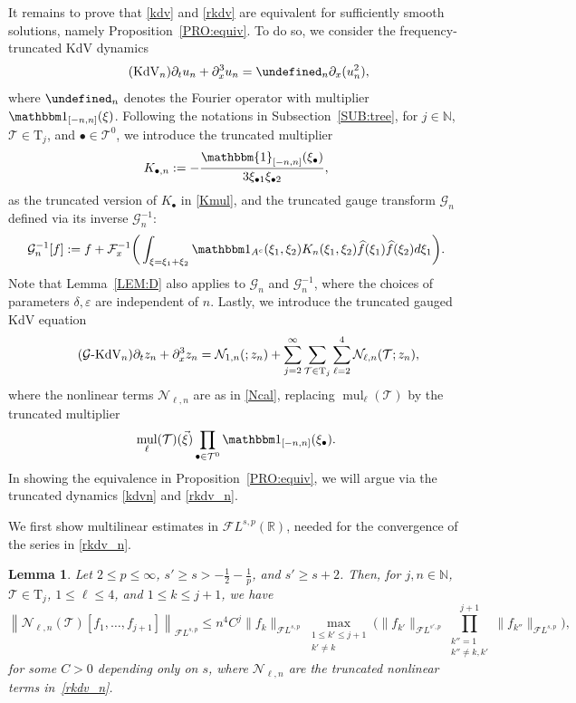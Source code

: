 \documentclass[a4paper,
11pt,  reqno]{amsart}
\makeatletter
\newcommand{\5}{\textup{V}}
\newcommand{\FL}{\mathcal{F} L}
\newcommand{\ft}{\widehat}
\newcommand{\ind}{\mathbbm 1}
\newcommand{\dl}{\delta}
\newcommand{\eps}{\varepsilon}
\newcommand{\dx}{\partial_x}
\newcommand{\dt}{\partial_t}
\newtheorem{lemma}[theorem]{Lemma}
\theoremstyle{remark}
\newcommand{\R}{\mathbb{R}}
\newcommand{\bul}{\bullet}
\let\P= \undefined
\newcommand{\P}{\mathbf{P}}
\newcommand{\TT}{\mathcal{T}}
\newcommand{\Tr}{\mathrm{T}}
\newcommand{\Ft}{{\mathcal{F}}}
\renewcommand{\l}{\ell}
\newcommand{\N}{\mathbb{N}}
\DeclareMathOperator{\mul}{mul}
\def\<#1>{\csname MH@symb@#1\endcsname}
\newcommand{\Gc}{\mathcal{G}}
\numberwithin{equation}{section}
\numberwithin{theorem}{section}
\newcommand{\Ncal}{\mathcal{N}}
\makeatother
\begin{document}
It remains to prove that \eqref{kdv} and \eqref{rkdv} are equivalent for sufficiently smooth solutions, namely Proposition~\ref{PRO:equiv}.
To do so, we consider the frequency-truncated KdV dynamics
\begin{equation}\label{kdvn}\tag{KdV$_n$}
	\partial_t u_n+\partial_x^3 u_n = \P_{n}\partial_x(u_n^2),
\end{equation}
where $\P_n$ denotes the Fourier operator with multiplier $\ind_{[-n,n]}(\xi)$. Following the notations in Subsection~\ref{SUB:tree}, for $j\in \N$, $\TT\in\Tr_j$, and $\bul\in \TT^0$, we introduce the truncated multiplier
\begin{align}\label{Kmuln}
K_{\bul, n}:=-\frac{\mathbbm{1}_{[-n,n]}(\xi_\bul)}{3\xi_{\bul 1}\xi_{\bul2}},
\end{align}
as the truncated version of $K_\bul$ in \eqref{Kmul}, and the truncated gauge transform $\Gc_n$ defined via its inverse $\Gc_n^{-1}$:
   \begin{equation}
	\label{gauge_n}
	\Gc_n^{-1}[f]
	:= f + \Ft_x^{-1}\bigg( \int_{\xi=\xi_1+\xi_2} \ind_{A^c}(\xi_1,\xi_2) K_n(\xi_1,\xi_2) \ft{f}(\xi_1) \ft{f}(\xi_2) d\xi_1 \bigg).
\end{equation}
Note that Lemma~\ref{LEM:D} also applies to $\Gc_n$ and $\Gc_n^{-1}$, where the choices of parameters $\dl, \eps$ are independent of $n$.
%
Lastly, we introduce the truncated gauged KdV equation
\begin{equation}\label{rkdv_n}\tag{$\Gc$-KdV$_n$}
	\dt z_n
	+ \dx^3 z_n
	=
	\Ncal_{1,n}(\<1>;z_n) + \sum_{j=2}^\infty \sum_{\TT \in \Tr_j} \sum_{\l=2}^4  \Ncal_{\l,n}(\TT;z_n),
\end{equation}
where the nonlinear terms $\Ncal_{\l, n}$ are as in \eqref{Ncal}, replacing $\mul_\l(\TT)$ by the truncated multiplier
\begin{align}
\mul_\l (\TT) (\vec\xi) \prod_{\bul\in \TT^0} \ind_{[-n,n]}(\xi_\bul).
\end{align}
In showing the equivalence in Proposition~\ref{PRO:equiv}, we will argue via the truncated dynamics \eqref{kdvn} and \eqref{rkdv_n}.

We first show multilinear estimates in $\FL^{s,p}(\R)$, needed for the convergence of the series in \eqref{rkdv_n}.
\begin{lemma}\label{lem:estimativas_brutas}
Let $2 \le p \le \infty$, $s'\ge s > - \frac12 - \frac1p$, and $s'\ge s +2$. Then, for $j, n\in\N$, $\TT\in\Tr_j$, $1\le \l \le 4$, and $1 \le k \le j+1$, we have
\begin{equation}\label{eq:boundNn}
		\left\|\mathcal{N}_{\ell,n}(\TT)[f_1,\dots,f_{j+1}] \right\|_{\FL^{s,p}} \le  n^4 C^j \|f_k\|_{\FL^{s,p}}
\max_{\substack{1 \le k' \le  j+1 \\ k' \ne k}}
\bigg(
\|f_{k'}\|_{\FL^{s',p}} \prod_{\substack{k''=1 \\ k'' \ne k , k'}}^{j+1} \|f_{k''}\|_{\FL^{s,p}}
\bigg),
	\end{equation}
for some $C>0$ depending only on $s$, where $\Ncal_{\l, n}$ are the truncated nonlinear terms in~\eqref{rkdv_n}.
\end{lemma}
\end{document}
